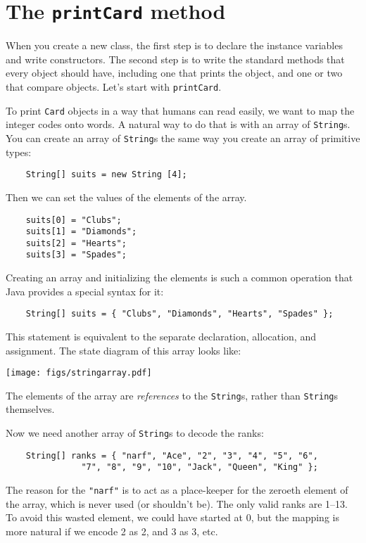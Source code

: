 \documentclass[12pt]{book}
\theoremstyle{definition}
\begin{document}
\section{The {\tt printCard} method}
\label{printcard}

When you create a new class, the first step is to declare the
instance variables and write constructors.  The second step is
to write the standard methods that every object should have, including
one that prints the object, and one or two that compare objects.
Let's start with {\tt printCard}.


To print {\tt Card} objects in a way that humans
can read easily, we want to map the integer codes onto words.
A natural way to do that is with an array of {\tt String}s.  You
can create an array of {\tt String}s the same way you create an
array of primitive types:

\begin{lstlisting}
    String[] suits = new String [4];
\end{lstlisting}
%
Then we can set the values of the elements of the array.

\begin{lstlisting}
    suits[0] = "Clubs";
    suits[1] = "Diamonds";
    suits[2] = "Hearts";
    suits[3] = "Spades";
\end{lstlisting}
%
Creating an array and initializing the elements is such a common
operation that Java provides a special syntax for it:

\begin{lstlisting}
    String[] suits = { "Clubs", "Diamonds", "Hearts", "Spades" };
\end{lstlisting}
%
This statement is equivalent to the
separate declaration, allocation, and assignment.  The state
diagram of this array looks like:

\texttt{[image: figs/stringarray.pdf]}


The elements of the array are {\em references} to the {\tt String}s,
rather than {\tt String}s themselves.

Now we need another array of {\tt String}s to decode the ranks:

\begin{lstlisting}
    String[] ranks = { "narf", "Ace", "2", "3", "4", "5", "6",
               "7", "8", "9", "10", "Jack", "Queen", "King" };
\end{lstlisting}
% 
The reason for the {\tt "narf"} is to act as a place-keeper for the
zeroeth element of the array, which is never used (or shouldn't be).
The only valid ranks are 1--13.  To avoid this wasted element,
we could have started at 0, but the mapping is more natural if we
encode 2 as 2, and 3 as 3, etc.
\end{document}
